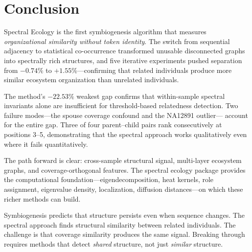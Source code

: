 \documentclass{../yalumba}
\begin{document}
\section{Conclusion}
\label{sec:conclusion}

Spectral Ecology is the first symbiogenesis algorithm that measures
\emph{organizational similarity without token identity}.  The switch from
sequential adjacency to statistical co-occurrence transformed unusable
disconnected graphs into spectrally rich structures, and five iterative
experiments pushed separation from $-0.74\%$ to $+1.55\%$---confirming that
related individuals produce more similar ecosystem organization than unrelated
individuals.


The method's $-22.53\%$ weakest gap confirms that within-sample spectral
invariants alone are insufficient for threshold-based relatedness detection.
Two failure modes---the spouse coverage confound and the NA12891 outlier---
account for the entire gap.  Three of four parent--child pairs rank
consecutively at positions 3--5, demonstrating that the spectral approach
works qualitatively even where it fails quantitatively.

The path forward is clear: cross-sample structural signal, multi-layer
ecosystem graphs, and coverage-orthogonal features.  The spectral ecology
package provides the computational foundation---eigendecomposition, heat
kernels, role assignment, eigenvalue density, localization, diffusion
distances---on which these richer methods can build.

\begin{pullquote}
Symbiogenesis predicts that structure persists even when sequence changes.
The spectral approach finds structural similarity between related individuals.
The challenge is that coverage similarity produces the same signal.  Breaking
through requires methods that detect \emph{shared} structure, not just
\emph{similar} structure.
\end{pullquote}




\end{document}

